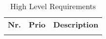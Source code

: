 \begin{longtable}{L{0.1\textwidth} L{0.12\textwidth} L{0.78\textwidth}}
			
	\textbf{Nr.} & \textbf{Prio} & \textbf{Description} \\
		
	
%			    
%			    
%			    
%			    
%			    

\caption{High Level Requirements}
\label{table:high-level-requirements}	    
\end{longtable}